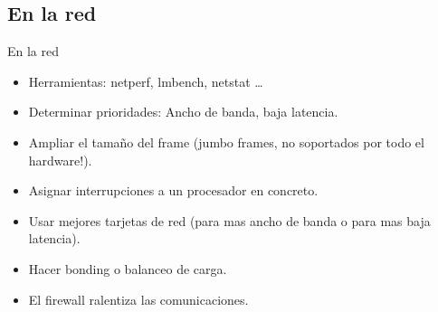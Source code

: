 \subsection{En la red}
\begin{frame}{En la red}
	\begin{itemize}
		\item Herramientas: netperf, lmbench, netstat \dots
		\item Determinar prioridades: Ancho de banda, baja latencia.
		\item Ampliar el tamaño del frame (jumbo frames, no soportados por todo el hardware!).
		\item Asignar interrupciones a un procesador en concreto.
		\item Usar mejores tarjetas de red (para mas ancho de banda o para mas baja latencia).
		\item Hacer bonding o balanceo de carga.
		\item El firewall ralentiza las comunicaciones.
	\end{itemize}
\end{frame}
